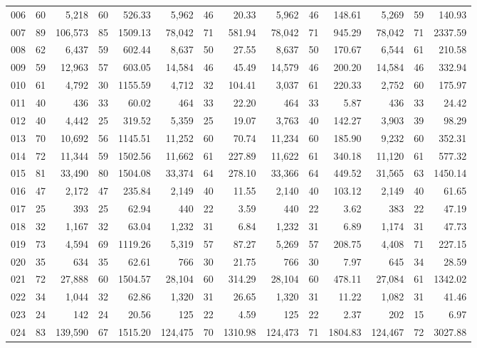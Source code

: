 {\begin{longtable}{@{}lr*{4}{rrr}@{}}
006 & 60 & 5,218 & 60 & 526.33 & 5,962 & 46 & 20.33 & 5,962 & 46 & 148.61 & 5,269 & 59 & 140.93 \\
007 & 89 & 106,573 & 85 & 1509.13 & 78,042 & 71 & 581.94 & 78,042 & 71 & 945.29 & 78,042 & 71 & 2337.59 \\
008 & 62 & 6,437 & 59 & 602.44 & 8,637 & 50 & 27.55 & 8,637 & 50 & 170.67 & 6,544 & 61 & 210.58 \\
009 & 59 & 12,963 & 57 & 603.05 & 14,584 & 46 & 45.49 & 14,579 & 46 & 200.20 & 14,584 & 46 & 332.94 \\
010 & 61 & 4,792 & 30 & 1155.59 & 4,712 & 32 & 104.41 & 3,037 & 61 & 220.33 & 2,752 & 60 & 175.97 \\
011 & 40 & 436 & 33 & 60.02 & 464 & 33 & 22.20 & 464 & 33 & 5.87 & 436 & 33 & 24.42 \\
012 & 40 & 4,442 & 25 & 319.52 & 5,359 & 25 & 19.07 & 3,763 & 40 & 142.27 & 3,903 & 39 & 98.29 \\
013 & 70 & 10,692 & 56 & 1145.51 & 11,252 & 60 & 70.74 & 11,234 & 60 & 185.90 & 9,232 & 60 & 352.31 \\
014 & 72 & 11,344 & 59 & 1502.56 & 11,662 & 61 & 227.89 & 11,622 & 61 & 340.18 & 11,120 & 61 & 577.32 \\
015 & 81 & 33,490 & 80 & 1504.08 & 33,374 & 64 & 278.10 & 33,366 & 64 & 449.52 & 31,565 & 63 & 1450.14 \\
016 & 47 & 2,172 & 47 & 235.84 & 2,149 & 40 & 11.55 & 2,140 & 40 & 103.12 & 2,149 & 40 & 61.65 \\
017 & 25 & 393 & 25 & 62.94 & 440 & 22 & 3.59 & 440 & 22 & 3.62 & 383 & 22 & 47.19 \\
018 & 32 & 1,167 & 32 & 63.04 & 1,232 & 31 & 6.84 & 1,232 & 31 & 6.89 & 1,174 & 31 & 47.73 \\
019 & 73 & 4,594 & 69 & 1119.26 & 5,319 & 57 & 87.27 & 5,269 & 57 & 208.75 & 4,408 & 71 & 227.15 \\
020 & 35 & 634 & 35 & 62.61 & 766 & 30 & 21.75 & 766 & 30 & 7.97 & 645 & 34 & 28.59 \\
021 & 72 & 27,888 & 60 & 1504.57 & 28,104 & 60 & 314.29 & 28,104 & 60 & 478.11 & 27,084 & 61 & 1342.02 \\
022 & 34 & 1,044 & 32 & 62.86 & 1,320 & 31 & 26.65 & 1,320 & 31 & 11.22 & 1,082 & 31 & 41.46 \\
023 & 24 & 142 & 24 & 20.56 & 125 & 22 & 4.59 & 125 & 22 & 2.37 & 202 & 15 & 6.97 \\
024 & 83 & 139,590 & 67 & 1515.20 & 124,475 & 70 & 1310.98 & 124,473 & 71 & 1804.83 & 124,467 & 72 & 3027.88 \\

\end{longtable}}
